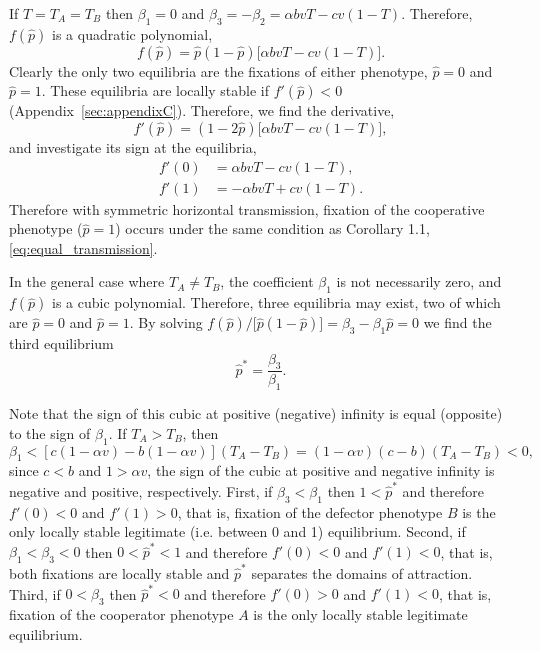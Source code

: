 \documentclass[12pt]{extarticle}
\begin{document}
If $T=T_A=T_B$ then $\beta_1=0$ and $\beta_3=-\beta_2=\alpha b vT -cv(1-T)$. 
Therefore, $f(\hat{p})$ is a quadratic polynomial,
\begin{equation} \label{eq:equal_horizontal_transmission}
  f(\hat{p}) = \hat{p}(1-\hat{p})\big[\alpha bvT - cv(1-T)\big].
\end{equation}
Clearly the only two equilibria are the fixations of either phenotype, $\hat{p} =  0$ and $\hat{p} = 1$.
These equilibria are locally stable if $f'(\hat{p})<0$ (Appendix~\autoref{sec:appendixC}).
Therefore, we find the derivative,
\begin{equation}
f'(\hat{p})=(1-2\hat{p})\big[\alpha bvT - cv(1-T)\big],
\end{equation}
and investigate its sign at the equilibria,
\begin{equation} \label{eq:derivative_of_phattag-phat}
\begin{aligned}
	f'(0) &=	\alpha bvT - cv(1-T), \\
	f'(1) &=	-\alpha bvT + cv(1-T).
\end{aligned}
\end{equation}
Therefore with symmetric horizontal transmission, fixation of the cooperative phenotype ($\hat{p}=1$) occurs under the same condition as Corollary 1.1, \autoref{eq:equal_transmission}.


In the general case where $T_A \neq T_B$, the coefficient $\beta_1$ is not necessarily zero, and $f(\hat{p})$ is a cubic polynomial.
Therefore, three equilibria may exist, two of which are
$\hat{p} = 0 $ and $\hat{p} = 1$.
By solving $f(\hat{p})/\big[\hat{p}(1-\hat{p})\big] = \beta_3 -\beta_1 \hat{p} = 0$ we  find the third equilibrium
\begin{equation} \label{eq:oblique_and_vertic_result}
  \hat{p}^* =  
  \frac{\beta_3}{\beta_1}.
\end{equation}

Note that the sign of this cubic at positive (negative) infinity is equal (opposite) to the sign of $\beta_1$. 
If $T_A>T_B$, then 
\begin{equation} \label{eq:beta1}
   \beta_1 < [c(1-\alpha v) - b(1-\alpha v)] (T_A-T_B) 
   = (1-\alpha v)(c-b)(T_A-T_B) < 0 ,
 \end{equation}
since $c<b$ and $1>\alpha v$, the sign of the cubic at positive and negative infinity is negative and positive, respectively.
First, if $\beta_3<\beta_1$ then 
$1<\hat{p}^*$ and therefore $f'(0)<0$ and $f'(1)>0$, that is, fixation of the defector phenotype $B$ is the only locally stable legitimate (i.e. between 0 and 1) equilibrium.
Second, if $\beta_1<\beta_3<0$ then 
$0<\hat{p}^*<1$ and therefore $f'(0)<0$ and $f'(1)<0$, that is, both fixations are locally stable and $\hat{p}^*$ separates the domains of attraction.
Third, if $0<\beta_3$ then 
$\hat{p}^*<0$ and therefore $f'(0)>0$ and $f'(1)<0$, that is, fixation of the cooperator phenotype $A$ is the only locally stable legitimate equilibrium.
\end{document}

